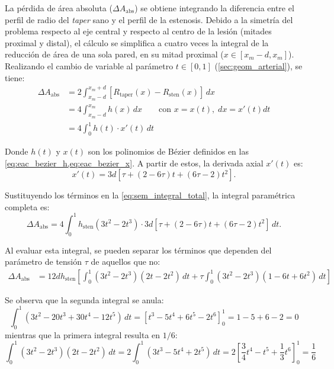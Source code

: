 \documentclass[12pt, letterpaper]{article}
\begin{document}
La pérdida de área absoluta ($\Delta A_{\text{abs}}$) se obtiene integrando la diferencia entre el perfil de radio del \textit{taper} sano y el perfil de la estenosis. Debido a la simetría del problema respecto al eje central y respecto al centro de la lesión (mitades proximal y distal), el cálculo se simplifica a cuatro veces la integral de la reducción de área de una sola pared, en su mitad proximal ($x \in [x_m - d, x_m]$). Realizando el cambio de variable al parámetro $t \in [0, 1]$ (\cref{sec:geom_arterial}), se tiene:
\begin{align}
  \Delta A_{\text{abs}} &= 2 \int_{x_m - d}^{x_m + d} \left[ R_{\mathrm{taper}}(x) - R_{\text{sten}}(x) \right] \, dx \nonumber \\
  &= 4 \int_{x_m - d}^{x_m} h(x) \, dx \qquad \text{con } x=x(t), \; dx=x'(t)dt \nonumber \\
  &= 4 \int_{0}^{1} h(t) \cdot x'(t) \, dt \label{eq:sem_integral_total}
\end{align}

Donde $h(t)$ y $x(t)$ son los polinomios de Bézier definidos en las \cref{eq:eac_bezier_h,eq:eac_bezier_x}. A partir de estos, la derivada axial $x'(t)$ es:
\begin{equation}
  \label{eq:sem_x_prime}
  x'(t) = 3d \left[ \tau + (2-6\tau)t + (6\tau-2)t^2 \right].
\end{equation}

Sustituyendo los términos en la \cref{eq:sem_integral_total}, la integral paramétrica completa es:
\begin{equation}
  \label{eq:sem_full_parametric_integral}
  \Delta A_{\text{abs}} = 4 \int_{0}^{1} h_{\mathrm{sten}}(3t^2 - 2t^3) \cdot 3d \left[ \tau + (2-6\tau)t + (6\tau-2)t^2 \right] \, dt.
\end{equation}

Al evaluar esta integral, se pueden separar los términos que dependen del parámetro de tensión $\tau$ de aquellos que no:
\begin{align*}
  \Delta A_{\text{abs}} &= 12 d h_{\mathrm{sten}} \left[ \int_{0}^{1} (3t^2 - 2t^3) (2t - 2t^2) \, dt + \tau \int_{0}^{1} (3t^2 - 2t^3) (1 - 6t + 6t^2) \, dt \right]
\end{align*}

Se observa que la segunda integral se anula:
\begin{equation}
  \int_{0}^{1} (3t^2 - 20t^3 + 30t^4 - 12t^5) \, dt = \left[ t^3 - 5t^4 + 6t^5 - 2t^6 \right]_0^1 = 1 - 5 + 6 - 2 = 0
\end{equation}
mientras que la primera integral resulta en $1/6$:
\begin{equation}
  \int_{0}^{1} (3t^2 - 2t^3) (2t - 2t^2) \, dt = 2 \int_{0}^{1} (3t^3 - 5t^4 + 2t^5) \, dt = 2 \left[ \frac{3}{4}t^4 - t^5 + \frac{1}{3}t^6 \right]_0^1 = \frac{1}{6}
\end{equation}
\end{document}
